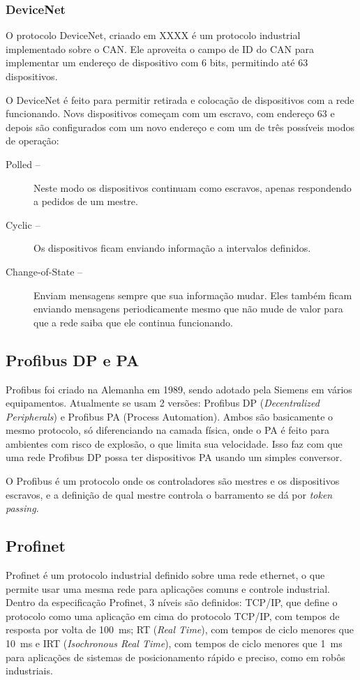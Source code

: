 \subsubsection{DeviceNet}
O protocolo DeviceNet, criaado em XXXX é um protocolo industrial implementado sobre o CAN. Ele aproveita o campo de ID do CAN para implementar um endereço de dispositivo com 6 bits, permitindo até 63 dispositivos.

O DeviceNet é feito para permitir retirada e colocação de dispositivos com a rede funcionando. Novs dispositivos começam com um escravo, com endereço 63 e depois são configurados com um novo endereço e com um de três possíveis modos de operação:
\begin{description}
    \item[Polled -- ]Neste modo os dispositivos continuam como escravos, apenas respondendo a pedidos de um mestre.
    \item[Cyclic -- ]Os dispositivos ficam enviando informação a intervalos definidos.
    \item[Change-of-State --] Enviam mensagens sempre que sua informação mudar. Eles também ficam enviando mensagens periodicamente mesmo que não mude de valor para que a rede saiba que ele continua funcionando.
\end{description}

\subsection{Profibus DP e PA}
Profibus foi criado na Alemanha em 1989, sendo adotado pela Siemens em vários equipamentos. Atualmente se usam 2 versões: Profibus DP (\emph{Decentralized Peripherals}) e Profibus PA (Process Automation). Ambos são basicamente o mesmo protocolo, só diferenciando na camada física, onde o PA é feito para ambientes com risco de explosão, o que limita sua velocidade. Isso faz com que uma rede Profibus DP possa ter dispositivos PA usando um simples conversor.

O Profibus é um protocolo onde os controladores são mestres e os dispositivos escravos, e a definição de qual mestre controla o barramento se dá por \emph{token passing}.

\subsection{Profinet}
Profinet é um protocolo industrial definido sobre uma rede ethernet, o que permite usar uma mesma rede para aplicações comuns e controle industrial. Dentro da especificação Profinet, 3 níveis são definidos: TCP/IP, que define o protocolo como uma aplicação em cima do protocolo TCP/IP, com tempos de resposta por volta de \SI{100}{ms}; RT (\emph{Real Time}), com tempos de ciclo menores que \SI{10}{ms} e IRT (\emph{Isochronous Real Time}), com tempos de ciclo menores que \SI{1}{ms} para aplicações de sistemas de posicionamento rápido e preciso, como em robôs industriais.


